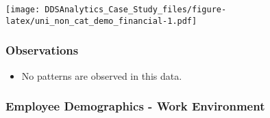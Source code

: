\documentclass[]{article}
\providecommand{\tightlist}{%
  \setlength{\itemsep}{0pt}\setlength{\parskip}{0pt}}
\begin{document}
\texttt{[image: DDSAnalytics\_Case\_Study\_files/figure-latex/uni\_non\_cat\_demo\_financial-1.pdf]}

\subsubsection{Observations}\label{observations-1}

\begin{itemize}
\tightlist
\item
  No patterns are observed in this data.
\end{itemize}

\subsubsection{Employee Demographics - Work
Environment}\label{employee-demographics---work-environment}
\end{document}
